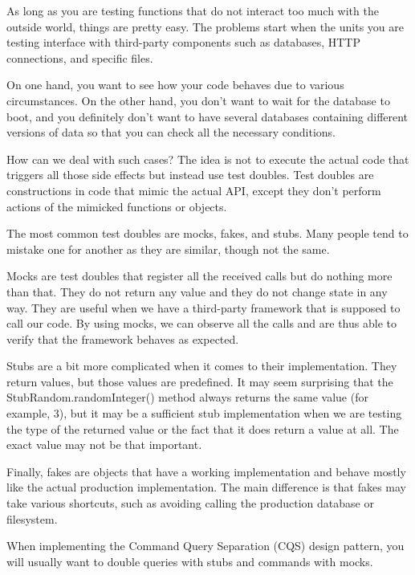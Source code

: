 
As long as you are testing functions that do not interact too much with the outside world, things are pretty easy. The problems start when the units you are testing interface with third-party components such as databases, HTTP connections, and specific files.

On one hand, you want to see how your code behaves due to various circumstances. On the other hand, you don't want to wait for the database to boot, and you definitely don't want to have several databases containing different versions of data so that you can check all the necessary conditions.

How can we deal with such cases? The idea is not to execute the actual code that triggers all those side effects but instead use test doubles. Test doubles are constructions in code that mimic the actual API, except they don't perform actions of the mimicked functions or objects.

The most common test doubles are mocks, fakes, and stubs. Many people tend to mistake one for another as they are similar, though not the same.


Mocks are test doubles that register all the received calls but do nothing more than that. They do not return any value and they do not change state in any way. They are useful when we have a third-party framework that is supposed to call our code. By using mocks, we can observe all the calls and are thus able to verify that the framework behaves as expected.

Stubs are a bit more complicated when it comes to their implementation. They return values, but those values are predefined. It may seem surprising that the StubRandom.randomInteger() method always returns the same value (for example, 3), but it may be a sufficient stub implementation when we are testing the type of the returned value or the fact that it does return a value at all. The exact value may not be that important.

Finally, fakes are objects that have a working implementation and behave mostly like the actual production implementation. The main difference is that fakes may take various shortcuts, such as avoiding calling the production database or filesystem.

When implementing the Command Query Separation (CQS) design pattern, you will  usually want to double queries with stubs and commands with mocks.

